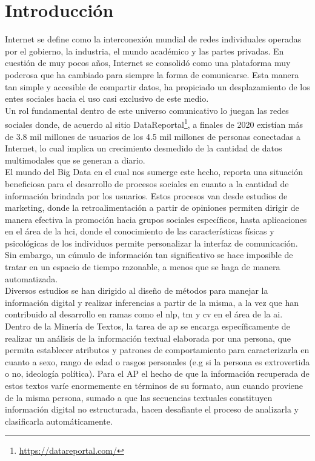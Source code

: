 \chapter*{Introducción}
Internet se define como la interconexión mundial de redes individuales operadas por el gobierno, la industria, el mundo académico y las partes privadas. En cuestión de muy pocos años, Internet se consolidó como una plataforma muy poderosa que ha cambiado para siempre la forma de comunicarse.  Esta manera tan simple y accesible de compartir datos, ha propiciado un desplazamiento de los entes sociales hacia el uso casi exclusivo de este medio.
\\
Un rol fundamental dentro de este universo comunicativo lo juegan las redes sociales donde, de acuerdo al sitio DataReportal\footnote{\url{https://datareportal.com/}}, a finales de 2020 existían más de 3.8 mil millones de usuarios de los 4.5 mil millones de personas conectadas a Internet, lo cual implica un crecimiento desmedido de la cantidad de datos multimodales que se generan a diario.
\\
El mundo del Big Data \citep{Riahi2018BigDA} en el cual nos sumerge este hecho, reporta una situación beneficiosa para el desarrollo de procesos sociales en cuanto a la cantidad de información brindada por los usuarios. 
Estos procesos van desde estudios de marketing, donde la retroalimentación a partir de opiniones permiten dirigir de manera efectiva la promoción hacia grupos sociales específicos, hasta aplicaciones en el área de la \ac{hci}, donde el conocimiento de las características físicas y psicológicas de los individuos permite personalizar la interfaz de comunicación. Sin embargo, un cúmulo de información tan significativo se hace imposible de tratar en un espacio de tiempo razonable, a menos que se haga de manera automatizada.
\\
Diversos estudios se han dirigido al diseño de métodos para manejar la información digital y realizar inferencias a partir de la misma, a la vez que han contribuido al desarrollo en ramas como el \ac{nlp}, \ac{tm} y \ac{cv} en el área de la \ac{ai}.
\\ 
Dentro de la Minería de Textos, la tarea de \ac{ap} \citep{Rosso2019,article} se encarga específicamente de realizar un análisis de la información textual elaborada por una persona, que permita establecer atributos y patrones de comportamiento para caracterizarla en cuanto a sexo, rango de edad o rasgos personales (e.g si la persona es extrovertida o no, ideología política). Para el AP el hecho de que la información recuperada de estos textos varíe enormemente en términos de su formato, aun cuando proviene de la misma persona, sumado a que las secuencias textuales constituyen información digital no estructurada, hacen desafiante el proceso de analizarla y clasificarla automáticamente. 
